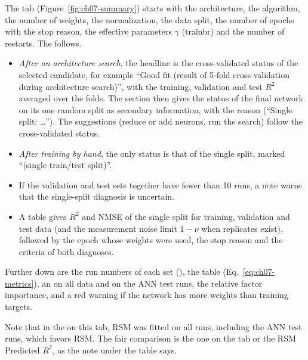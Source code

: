 The  tab (Figure~\ref{fig:ch07-summary}) starts with the architecture, the algorithm, the
number of weights, the normalization, the data split, the number of epochs with the stop reason, the effective
parameters $\gamma$ (trainbr) and the number of restarts. The  follows.
\begin{itemize}
  \item \emph{After an architecture search}, the headline is the cross-validated status of the selected
    candidate, for example ``Good fit (result of 5-fold cross-validation during architecture search)'', with the
    training, validation and test $R^2$ averaged over the folds. The section  then gives the status of the final network on its one random split as secondary information, with the
    reason (``Single split: \dots''). The suggestions (reduce or add neurons, run the search) follow the
    cross-validated status.
  \item \emph{After training by hand}, the only status is that of the single split, marked ``(single train/test
    split)''.
  \item If the validation and test sets together have fewer than 10 runs, a note warns that the single-split
    diagnosis is uncertain.
  \item A table gives $R^2$ and NMSE of the single split for training, validation and test data (and the
    measurement noise limit $1-\nu$ when replicates exist), followed by the epoch whose weights were used, the
    stop reason and the criteria of both diagnoses.
\end{itemize}
Further down are the run numbers of each set (), the  table
(Eq.~\eqref{eq:ch07-metrics}), an  on all data and on the ANN test runs, the relative
factor importance, and a red warning if the network has more weights than training targets.

Note that in the  on this tab, RSM was fitted on all runs, including the ANN test runs,
which favors RSM. The fair comparison is the one on the  tab or the RSM Predicted $R^2$,
as the note under the table says.

